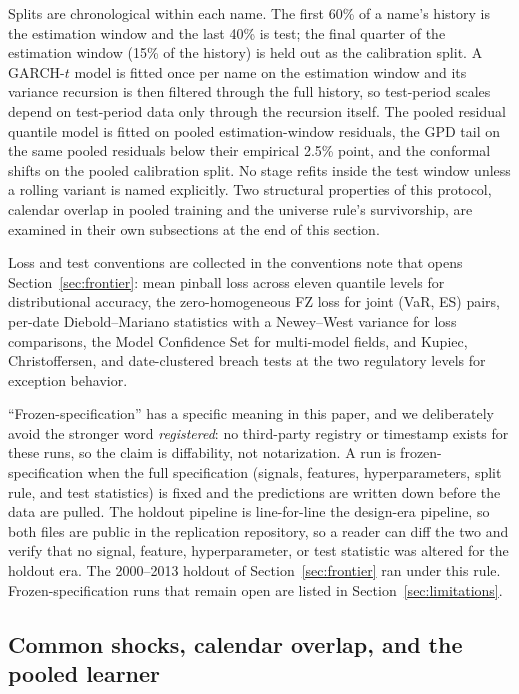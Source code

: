 \documentclass[11pt]{article}
\theoremstyle{remark}
\begin{document}
Splits are chronological within each name. The first 60\% of a name's
history is the estimation window and the last 40\% is test; the final
quarter of the estimation window (15\% of the history) is held out as
the calibration split. A GARCH-$t$ model is fitted once per name on
the estimation window and its variance recursion is then filtered
through the full history, so test-period scales depend on test-period
data only through the recursion itself. The pooled residual quantile
model is fitted on pooled estimation-window residuals, the GPD tail on
the same pooled residuals below their empirical 2.5\% point, and the
conformal shifts on the pooled calibration split. No stage refits
inside the test window unless a rolling variant is named explicitly.
Two structural properties of this protocol, calendar overlap in
pooled training and the universe rule's survivorship, are examined in
their own subsections at the end of this section.

Loss and test conventions are collected in the conventions note that
opens Section~\ref{sec:frontier}: mean pinball loss across eleven
quantile levels for distributional accuracy, the zero-homogeneous FZ
loss \citep{fissler2016,patton2019} for joint (VaR, ES) pairs,
per-date Diebold--Mariano statistics with a Newey--West variance for
loss comparisons, the Model Confidence Set for multi-model fields, and
Kupiec, Christoffersen, and date-clustered breach tests at the two
regulatory levels for exception behavior.

``Frozen-specification'' has a specific meaning in this paper, and we
deliberately avoid the stronger word \emph{registered}: no third-party
registry or timestamp exists for these runs, so the claim is
diffability, not notarization. A run is frozen-specification when the
full specification (signals, features,
hyperparameters, split rule, and test statistics) is fixed and the
predictions are written down before the data are pulled. The holdout pipeline is line-for-line the design-era pipeline, so both files are public in the replication repository, so a reader
can diff the two and verify that no signal, feature, hyperparameter,
or test statistic was altered for the holdout era. The
2000--2013 holdout of Section~\ref{sec:frontier} ran under this rule.
Frozen-specification runs that remain open are listed in
Section~\ref{sec:limitations}.

\subsection{Common shocks, calendar overlap, and the pooled learner}
\label{sec:calendarleak}
\end{document}
